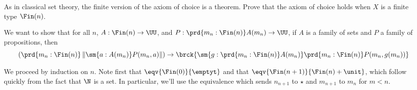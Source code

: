 As in classical set theory, the finite version of the axiom of choice is a
theorem.  Prove that the axiom of choice holds when $X$ is a finite type
$\Fin(n)$.


 \soln
We want to show that for all $n$, $A : \Fin(n) \to \UU$, and 
$P : \prd{m_{n} : \Fin(n)} A(m_{n}) \to \UU$, if $A$ is a family of sets and
$P$ a family of propositions, then
\[
  \left(
    \prd{m_{n} : \Fin(n)} \left\lVert \sm{a:A(m_{n})} P(m_{n}, a)\right\rVert
  \right)
  \to
  \brck{
    \sm{g : \prd{m_{n} : \Fin(n)} A(m_{n})} \prd{m_{n} : \Fin(n)}
        P(m_{n}, g(m_{n}))
  }
\]


We proceed by induction on $n$.  Note first that $\eqv{\Fin(0)}{\emptyt}$ and
that $\eqv{\Fin(n + 1)}{\Fin(n) + \unit}$, which follow quickly from the fact
that $\N$ is a set.  In particular, we'll use the equivalence which sends
$n_{n+1}$ to $\star$ and $m_{n+1}$ to $m_{n}$ for $m < n$.


